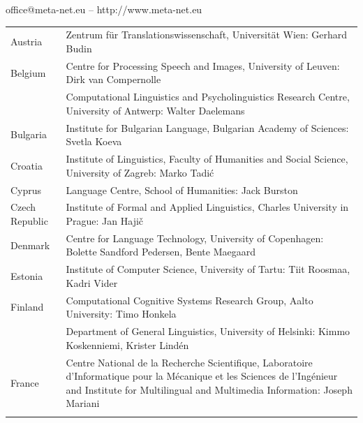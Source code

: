 \documentclass[]{../../metanetpaper}
\begin{document}
\vfill
\centerline{office@meta-net.eu -- http://www.meta-net.eu}

\cleardoublepage

\appendix
{}



  
\cleardoublepage

\label{metanetmembers}

\small

\begin{longtable}{@{}lp{137mm}@{}}
Austria & Zentrum für Translationswissenschaft, Universität Wien: Gerhard Budin\\ \addlinespace 
Belgium & Centre for Processing Speech and Images, University of Leuven: Dirk van Compernolle \\ \addlinespace
& Computational Linguistics and Psycholinguistics Research Centre, University of Antwerp: \newline Walter Daelemans\\ \addlinespace
Bulgaria & Institute for Bulgarian Language, Bulgarian Academy of Sciences: Svetla Koeva \\ \addlinespace
Croatia & Institute of Linguistics, Faculty of Humanities and Social Science, University of Zagreb: Marko Tadić \\ \addlinespace
Cyprus & Language Centre, School of Humanities: Jack Burston \\ \addlinespace
Czech Republic & Institute of Formal and Applied Linguistics, Charles University in Prague: Jan Hajič \\ \addlinespace
Denmark & Centre for Language Technology, University of Copenhagen: Bolette Sandford Pedersen, \newline Bente Maegaard\\ \addlinespace
Estonia & Institute of Computer Science, University of Tartu: Tiit Roosmaa, Kadri Vider\\ \addlinespace
Finland & Computational Cognitive Systems Research Group, Aalto University: Timo Honkela\\ \addlinespace
& Department of General Linguistics, University of Helsinki: Kimmo Koskenniemi, Krister Lindén \\ \addlinespace
France & Centre National de la Recherche Scientifique, Laboratoire d'Informatique pour la Mécanique et les Sciences de l'Ingénieur and Institute for Multilingual and Multimedia Information: Joseph Mariani \\ \addlinespace

\end{longtable}
\end{document}
